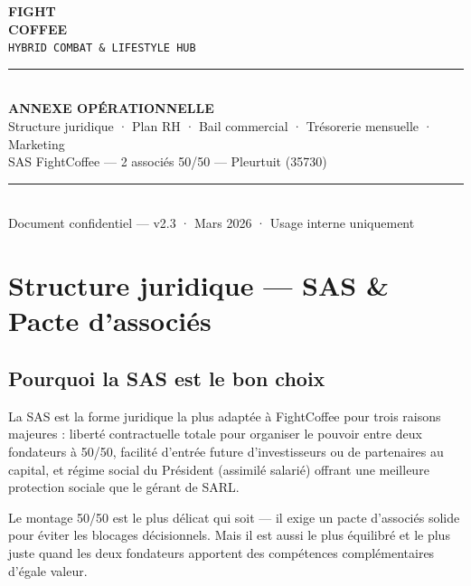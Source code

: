 \documentclass[11pt, a4paper]{article}
\newcommand{\eyebrow}[1]{%
  \vspace{4pt}{\small\color{fc-ink3}\texttt{— #1}}\vspace{2pt}
}
\begin{document}
\thispagestyle{empty}
\vspace*{3cm}
\begin{center}
  {\fontsize{48}{52}\selectfont\bfseries\color{fc-ink} FIGHT}\\[2pt]
  {\fontsize{48}{52}\selectfont\bfseries\color{fc-red} COFFEE}\\[12pt]
  {\large\color{fc-ink3}\texttt{HYBRID COMBAT \& LIFESTYLE HUB}}\\[40pt]
  \color{fc-rule}\rule{10cm}{0.6pt}\\[24pt]
  {\Large\bfseries\color{fc-ink} ANNEXE OPÉRATIONNELLE}\\[10pt]
  {\normalsize\color{fc-ink2} Structure juridique · Plan RH · Bail commercial · Trésorerie mensuelle · Marketing}\\[6pt]
  {\normalsize\color{fc-ink2} SAS FightCoffee — 2 associés 50/50 — Pleurtuit (35730)}\\[40pt]
  \color{fc-rule}\rule{10cm}{0.6pt}\\[20pt]
  {\small\color{fc-ink3} Document confidentiel — v2.3 · Mars 2026 · Usage interne uniquement}
\end{center}

\newpage
\tableofcontents
\newpage

\section{Structure juridique — SAS \& Pacte d'associés}
\eyebrow{A — STRUCTURE JURIDIQUE}

\subsection{Pourquoi la SAS est le bon choix}

La SAS est la forme juridique la plus adaptée à FightCoffee pour trois raisons majeures : liberté contractuelle totale pour organiser le pouvoir entre deux fondateurs à 50/50, facilité d'entrée future d'investisseurs ou de partenaires au capital, et régime social du Président (assimilé salarié) offrant une meilleure protection sociale que le gérant de SARL.

Le montage 50/50 est le plus délicat qui soit — il exige un pacte d'associés solide pour éviter les blocages décisionnels. Mais il est aussi le plus équilibré et le plus juste quand les deux fondateurs apportent des compétences complémentaires d'égale valeur.
\end{document}
